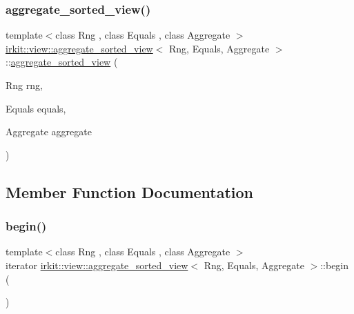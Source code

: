 \subsubsection{\texorpdfstring{aggregate\+\_\+sorted\+\_\+view()}{aggregate\_sorted\_view()}}
{\footnotesize\ttfamily template$<$class Rng , class Equals , class Aggregate $>$ \\
\mbox{\hyperlink{classirkit_1_1view_1_1aggregate__sorted__view}{irkit\+::view\+::aggregate\+\_\+sorted\+\_\+view}}$<$ Rng, Equals, Aggregate $>$\+::\mbox{\hyperlink{classirkit_1_1view_1_1aggregate__sorted__view}{aggregate\+\_\+sorted\+\_\+view}} (\begin{DoxyParamCaption}\item[{Rng}]{rng,  }\item[{Equals}]{equals,  }\item[{Aggregate}]{aggregate }\end{DoxyParamCaption})\hspace{0.3cm}{\ttfamily [inline]}}



\subsection{Member Function Documentation}
\mbox{\label{classirkit_1_1view_1_1aggregate__sorted__view_a6e45f5ee40da2b8f4fed52e0b8fec8de}} 
\subsubsection{\texorpdfstring{begin()}{begin()}}
{\footnotesize\ttfamily template$<$class Rng , class Equals , class Aggregate $>$ \\
iterator \mbox{\hyperlink{classirkit_1_1view_1_1aggregate__sorted__view}{irkit\+::view\+::aggregate\+\_\+sorted\+\_\+view}}$<$ Rng, Equals, Aggregate $>$\+::begin (\begin{DoxyParamCaption}{ }\end{DoxyParamCaption})\hspace{0.3cm}{\ttfamily [inline]}}

\mbox{\label{classirkit_1_1view_1_1aggregate__sorted__view_ae49c7357a20d9b26eec64f28c2834585}} 
